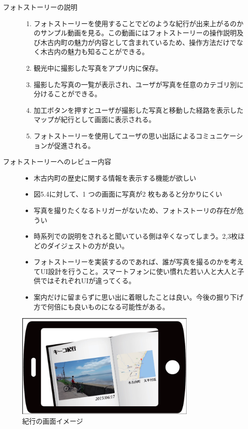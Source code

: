 \begin{description}
 \item[フォトストーリーの説明]\mbox{}
 \begin{enumerate}
 \item フォトストーリーを使用することでどのような紀行が出来上がるのかのサンプル動画を見る。この動画にはフォトストーリーの操作説明及び木古内町の魅力が内容として含まれているため、操作方法だけでなく木古内の魅力も知ることができる。
  \item 観光中に撮影した写真をアプリ内に保存。
 \item 撮影した写真の一覧が表示され、ユーザが写真を任意のカテゴリ別に分けることができる。
 \item 加工ボタンを押すとユーザが撮影した写真と移動した経路を表示したマップが紀行として画面に表示される。
 \item フォトストーリーを使用してユーザの思い出話によるコミュニケーションが促進される。
\end{enumerate}
\item[フォトストーリーへのレビュー内容]\mbox{}
 \begin{itemize}
 \item 木古内町の歴史に関する情報を表示する機能が欲しい
 \item 図5.4に対して、1 つの画面に写真が2 枚もあると分かりにくい
 \item 写真を撮りたくなるトリガーがないため、フォトストーリの存在が危うい
 \item 時系列での説明をされると聞いている側は辛くなってしまう。2,3枚ほどのダイジェストの方が良い。
 \item フォトストーリーを実装するのであれば、誰が写真を撮るのかを考えてUI設計を行うこと。スマートフォンに使い慣れた若い人と大人と子供ではそれぞれUIが違ってくる。
 \item 案内だけに留まらずに思い出に着眼したことは良い。今後の掘り下げ方で何倍にも良いものになる可能性がある。
 \end{itemize}
\end{description}

\begin{figure}[htbp]
 \begin{center}
\includegraphics[width=9cm, bb=0 0 857 498]{5.1_kikou.png}
 \end{center}
\addtocounter{figure}{+0}
 \caption{紀行の画面イメージ}
 \label{fig:one}
\end{figure}
